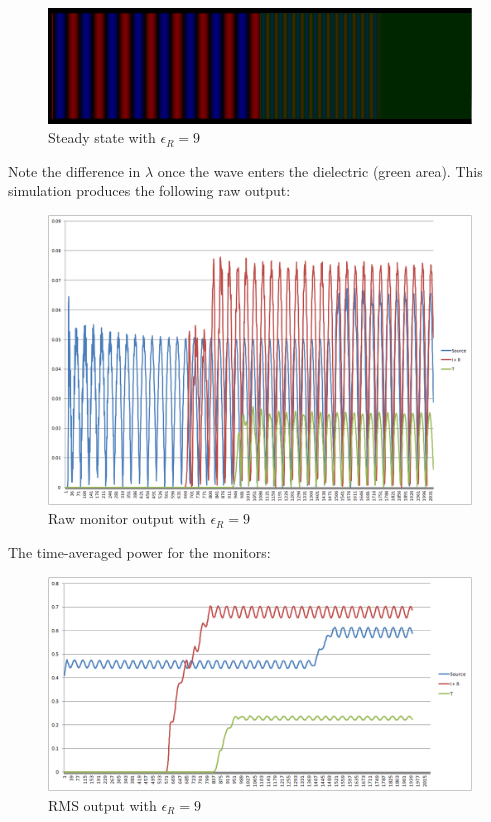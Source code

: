 \begin{figure}[H]
	\centering
	\includegraphics[width=\textwidth,
	keepaspectratio]{pw-epsilon-9.png}
	\caption{Steady state with $\epsilon_R = 9$}
	\label{fig:pwEpsilon9}
\end{figure}

Note the difference in $\lambda$ once the wave enters the dielectric (green area). This simulation produces the following raw output:

\begin{figure}[H]
	\centering
	\includegraphics[width=\textwidth,
	keepaspectratio]{pw-epsilon-9-raw.png}
	\caption{Raw monitor output with $\epsilon_R = 9$}
	\label{fig:pwEpsilon9Raw}
\end{figure}

The time-averaged power for the monitors:

\begin{figure}[H]
	\centering
	\includegraphics[width=\textwidth,
	keepaspectratio]{pw-epsilon-9-rms.png}
	\caption{RMS output with $\epsilon_R = 9$}
	\label{fig:pwEpsilon9RMS}
\end{figure}

